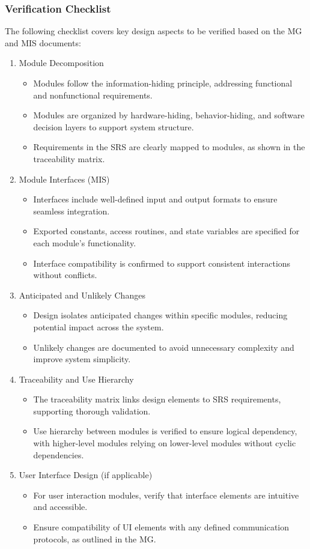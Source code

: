 \documentclass[12pt, titlepage]{article}
\begin{document}
\subsubsection{Verification Checklist}
The following checklist covers key design aspects to be verified based on the MG and MIS documents:
\begin{enumerate}
  \item Module Decomposition
    \begin{itemize}
      \item Modules follow the information-hiding principle, addressing functional and nonfunctional requirements.
      \item Modules are organized by hardware-hiding, behavior-hiding, and software decision layers to support system structure.
      \item Requirements in the SRS are clearly mapped to modules, as shown in the traceability matrix.
    \end{itemize}
  \item Module Interfaces (MIS)
    \begin{itemize}
      \item Interfaces include well-defined input and output formats to ensure seamless integration.
      \item Exported constants, access routines, and state variables are specified for each module’s functionality.
      \item Interface compatibility is confirmed to support consistent interactions without conflicts.
    \end{itemize}
  \item Anticipated and Unlikely Changes
    \begin{itemize}
      \item Design isolates anticipated changes within specific modules, reducing potential impact across the system.
      \item Unlikely changes are documented to avoid unnecessary complexity and improve system simplicity.
    \end{itemize}
  \item Traceability and Use Hierarchy
    \begin{itemize}
      \item The traceability matrix links design elements to SRS requirements, supporting thorough validation.
      \item Use hierarchy between modules is verified to ensure logical dependency, with higher-level modules relying on lower-level modules without cyclic dependencies.
    \end{itemize}
  \item User Interface Design (if applicable)
    \begin{itemize}
      \item For user interaction modules, verify that interface elements are intuitive and accessible.
      \item Ensure compatibility of UI elements with any defined communication protocols, as outlined in the MG.
    \end{itemize}
\end{enumerate}
\end{document}
